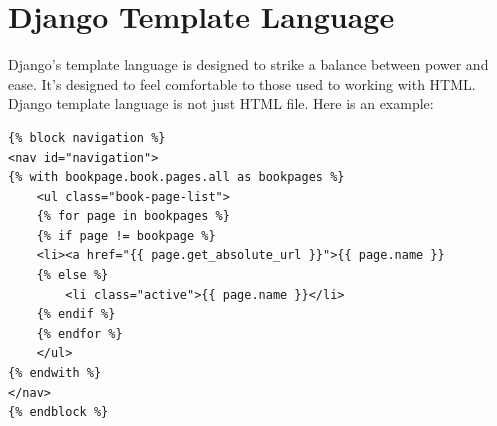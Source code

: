 \section{Django Template Language}
Django’s template language is designed to strike a balance between power and ease. It’s designed to feel comfortable to those used to working with HTML. \\
Django template language is not just HTML file. Here is an example:
\begin{verbatim}
{% block navigation %}
<nav id="navigation">
{% with bookpage.book.pages.all as bookpages %}
    <ul class="book-page-list">
    {% for page in bookpages %}
    {% if page != bookpage %}
    <li><a href="{{ page.get_absolute_url }}">{{ page.name }}
    {% else %}
        <li class="active">{{ page.name }}</li>
    {% endif %}
    {% endfor %}
    </ul>
{% endwith %}
</nav>
{% endblock %}
\end{verbatim}

